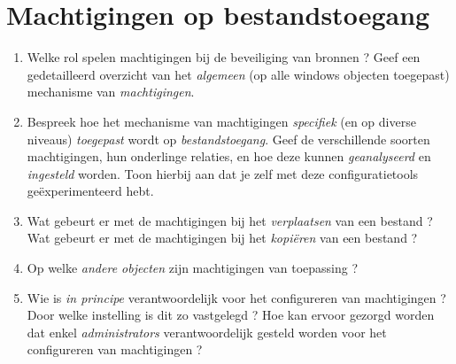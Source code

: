 \documentclass{report}
\newcommand{\vraag}[2]{
	\item #1
	
	#2
}
\begin{document}
	\section{Machtigingen op bestandstoegang }
	\begin{enumerate}
		\vraag { Welke rol spelen machtigingen bij de beveiliging van bronnen ? Geef een gedetailleerd overzicht van het \textit{algemeen} (op alle windows objecten toegepast) mechanisme van \textit{machtigingen}. } { }
		
		\vraag { Bespreek hoe het mechanisme van machtigingen \textit{specifiek} (en op diverse niveaus) \textit{toegepast} wordt op \textit{bestandstoegang}. Geef de verschillende soorten machtigingen, hun onderlinge relaties, en hoe deze kunnen \textit{geanalyseerd} en \textit{ingesteld} worden. Toon hierbij aan dat je zelf met deze configuratietools geëxperimenteerd hebt. } { }
		
		\vraag { Wat gebeurt er met de machtigingen bij het \textit{verplaatsen} van een bestand ? Wat gebeurt er met de machtigingen bij het \textit{kopiëren} van een bestand ? } { }
		
		\vraag { Op welke \textit{andere objecten} zijn machtigingen van toepassing ? } { }
		
		\vraag { Wie is \textit{in principe} verantwoordelijk voor het configureren van machtigingen ? Door welke instelling is dit zo vastgelegd ? Hoe kan ervoor gezorgd worden dat enkel \textit{administrators} verantwoordelijk gesteld worden voor het configureren van machtigingen ? } { \todo{Oplossen}}
		
	\end{enumerate}
\end{document}
